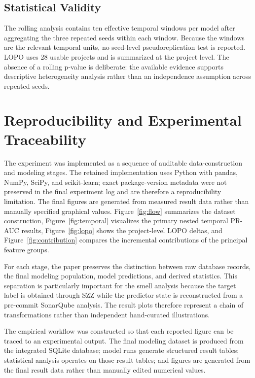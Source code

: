 \documentclass[conference]{IEEEtran}
\begin{document}
\subsection{Statistical Validity}
The rolling analysis contains ten effective temporal windows per model after aggregating the three repeated seeds within each window. Because the windows are the relevant temporal units, no seed-level pseudoreplication test is reported. LOPO uses 28 usable projects and is summarized at the project level. The absence of a rolling p-value is deliberate: the available evidence supports descriptive heterogeneity analysis rather than an independence assumption across repeated seeds.

\section{Reproducibility and Experimental Traceability}
The experiment was implemented as a sequence of auditable data-construction and modeling stages. The retained implementation uses Python with pandas, NumPy, SciPy, and scikit-learn; exact package-version metadata were not preserved in the final experiment log and are therefore a reproducibility limitation. The final figures are generated from measured result data rather than manually specified graphical values. Figure~\ref{fig:flow} summarizes the dataset construction, Figure~\ref{fig:temporal} visualizes the primary nested temporal PR-AUC results, Figure~\ref{fig:lopo} shows the project-level LOPO deltas, and Figure~\ref{fig:contribution} compares the incremental contributions of the principal feature groups.

For each stage, the paper preserves the distinction between raw database records, the final modeling population, model predictions, and derived statistics. This separation is particularly important for the smell analysis because the target label is obtained through SZZ while the predictor state is reconstructed from a pre-commit SonarQube analysis. The result plots therefore represent a chain of transformations rather than independent hand-curated illustrations.

The empirical workflow was constructed so that each reported figure can be traced to an experimental output. The final modeling dataset is produced from the integrated SQLite database; model runs generate structured result tables; statistical analysis operates on those result tables; and figures are generated from the final result data rather than manually edited numerical values.
\end{document}
